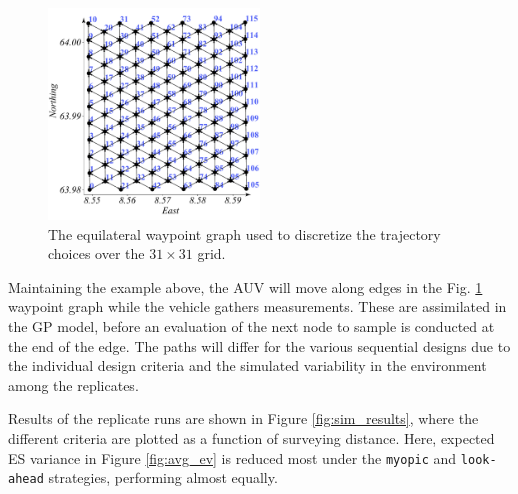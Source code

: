 \documentclass[aoas]{imsart}
\begin{document}
\begin{figure}[t]
\centering
\includegraphics[width=0.50\textwidth]{Figures/sim/wp_graph_paper.pdf}
\caption{The equilateral waypoint graph used to discretize the
  trajectory choices over the $31\times31$ grid.}
\label{fig:wp_graph}
\end{figure}

Maintaining the example above, the AUV will move along edges in the
Fig. \ref{fig:wp_graph} waypoint graph while the vehicle gathers
measurements. These are assimilated in the GP model, before an
evaluation of the next node to sample is conducted at the end of the
edge. The paths will differ for the various sequential designs due to
the individual design criteria and the simulated variability in the
environment among the replicates.

Results of the replicate runs are shown in Figure \ref{fig:sim_results},
where the different criteria are plotted as a function of surveying
distance. Here, expected ES variance in Figure \ref{fig:avg_ev} is
reduced most under the \texttt{myopic} and \texttt{look-ahead}
strategies, performing almost equally.
\end{document}
